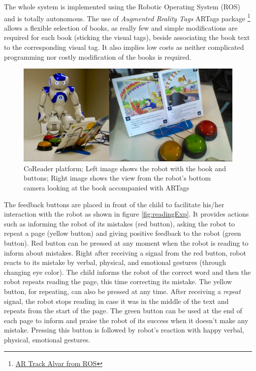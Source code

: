 \documentclass{sigchi}
\begin{document}
The whole system is implemented using the Robotic Operating System (ROS) and is totally autonomous.
The use of \textit{Augmented Reality Tags} ARTags package \footnote{\href{http://wiki.ros.org/ar_track_alvar}{AR Track Alvar from ROS}} allows a flexible selection of books, as really few and simple modifications are required for each book (sticking the visual tags), beside associating the book text to the corresponding visual tag. 
It also implies low costs as neither complicated programming nor costly modification of the books is required.
\begin{figure}[t]
  \centering
  \includegraphics[width=1\linewidth]{figures/booknrobot2.jpg}
  \caption{CoReader platform; Left image shows the robot with the book and buttons; Right image shows the view from the robot's bottom camera looking at the book accompanied with ARTags}
  \label{fig:readingPlatform}
\end{figure}

The feedback buttons are placed in front of the child to facilitate his/her interaction with the robot as shown in figure \ref{fig:readingExp}. 
It provides actions such as informing the robot of its mistakes (red button), asking the robot to repeat a page (yellow button) and giving positive feedback to the robot (green button). 
Red button can be pressed at any moment when the robot is reading to inform about mistakes. 
Right after receiving a signal from the red button, robot reacts to its mistake by verbal, physical, and emotional gestures (through changing eye color). 
The child informs the robot of the correct word and then the robot repeats reading the page, this time correcting its mistake. 
The yellow button, for repeating, can also be pressed at any time. 
After receiving a \emph{repeat} signal, the robot stops reading in case it was in the middle of the text and repeats from the start of the page. 
The green button can be used at the end of each page to inform and praise the robot of its success when it doesn't make any mistake. 
Pressing this button is followed by robot's reaction with happy verbal, physical, emotional gestures.
\end{document}
